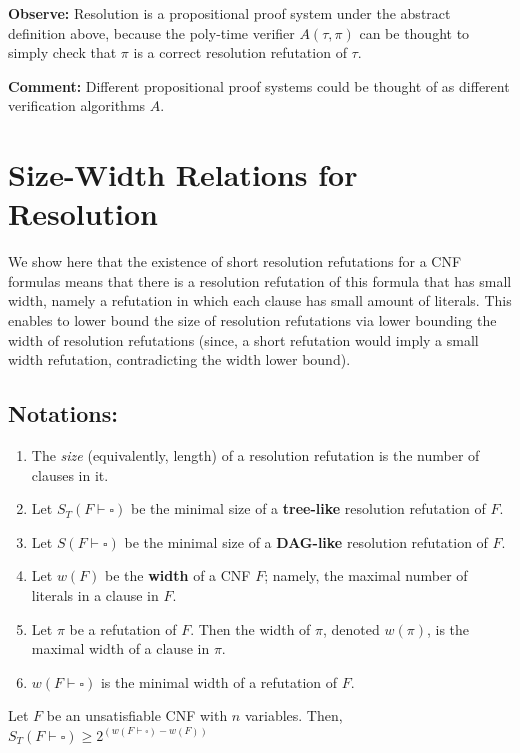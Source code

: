 \textbf{Observe:} Resolution is a propositional proof system under the abstract definition above, because the poly-time verifier $A(\tau, \pi)$ can be thought to simply check that $\pi$ is a correct resolution refutation of $\tau$.

\textbf{Comment:} Different propositional proof systems could be thought of as different verification algorithms $A$.


\section{Size-Width Relations for Resolution}

 We show here that the existence of short resolution refutations for a CNF formulas means that there is a resolution refutation of this formula that has small width, namely a refutation in which each clause has small amount of literals. This enables to lower bound the size of resolution refutations via lower bounding the width of resolution refutations  (since, a short refutation would imply a small width refutation, contradicting the width lower bound).

\subsection*{Notations:}
\begin{enumerate}
    \item The \emph{size} (equivalently, length) of a resolution refutation is the number of clauses in it.
    \item Let $S_T(F \vdash \square)$ be the minimal size of a \textbf{tree-like} resolution refutation of $F$.
    \item Let $S(F \vdash \square)$ be the minimal size of a \textbf{DAG-like} resolution refutation of $F$.
    \item Let $w(F)$ be the \textbf{width} of a CNF $F$; namely, the maximal number of literals in a clause in $F$.
    \item Let $\pi$ be a refutation of $F$. Then the width of $\pi$, denoted $w(\pi)$, is the maximal width of a clause in $\pi$.
    \item $w(F \vdash \square)$ is the minimal width of a refutation of $F$.
\end{enumerate}


\begin{tcolorbox}[colframe=white, colback=blue!4, boxrule=0mm, sharp corners]
\begin{theorem}
\label{thm:tree-like-sw}
Let $F$ be an unsatisfiable CNF with $n$ variables. Then, $S_T(F \vdash \square) \geq 2^{(w(F \vdash \square) - w(F))}$
\end{theorem}
\end{tcolorbox}



